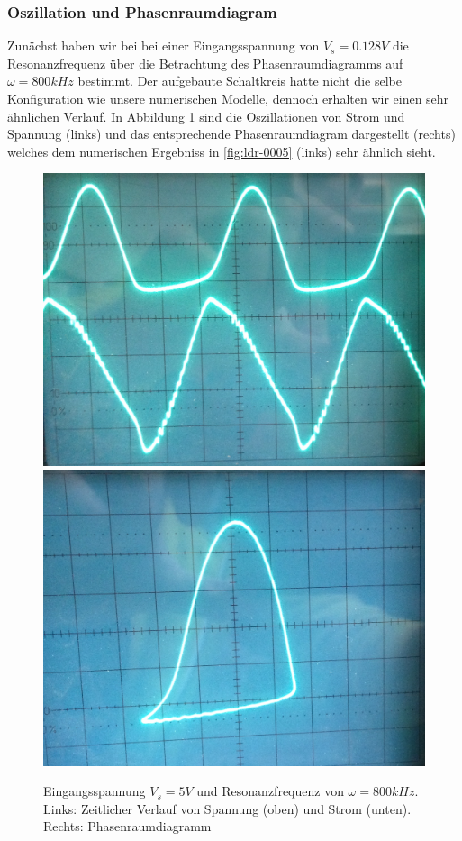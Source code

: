 \documentclass[12pt,a4paper]{article}
\begin{document}
\subsubsection { Oszillation und Phasenraumdiagram }
Zunächst haben wir bei bei einer Eingangsspannung von $V_s=0.128V$ die Resonanzfrequenz über die Betrachtung des Phasenraumdiagramms auf $\omega=800kHz$ bestimmt. 
Der aufgebaute Schaltkreis hatte nicht die selbe Konfiguration wie unsere numerischen Modelle, dennoch erhalten wir einen sehr ähnlichen Verlauf. In Abbildung \ref{fig:ldr-real1} sind die Oszillationen von Strom und Spannung (links) und das entsprechende Phasenraumdiagram dargestellt (rechts) welches dem numerischen Ergebniss in \ref{fig:ldr-0005} (links) sehr ähnlich sieht. 
\begin{figure}[!htbp]
\centering
\includegraphics[scale=0.1]{800khz-5V-oszi}
\includegraphics[scale=0.11]{800khz-5V-phase}
\caption{Eingangsspannung $V_s=5V$ und Resonanzfrequenz von $\omega=800kHz$. Links: Zeitlicher Verlauf von Spannung (oben) und Strom (unten). Rechts: Phasenraumdiagramm}
\label{fig:ldr-real1}
\end{figure}
\end{document}
